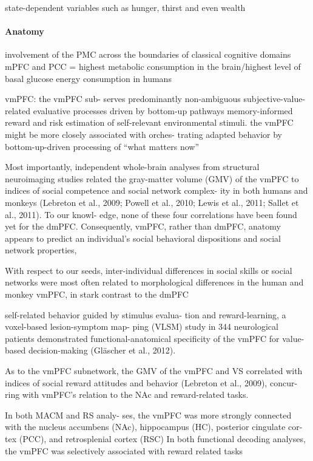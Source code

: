 \documentclass{article} %
\begin{document}


state-dependent variables such as hunger, thirst and
even wealth




\paragraph{Anatomy}
 involvement of the PMC across the boundaries of classical cognitive domains
mPFC and PCC = highest metabolic consumption in the brain/highest level of basal glucose energy consumption in humans


vmPFC:
the vmPFC sub- serves predominantly non-ambiguous subjective-value-related evaluative processes driven by bottom-up pathways
memory-informed reward and risk estimation of self-relevant environmental stimuli.
the vmPFC might be more closely associated with orches- trating adapted behavior by bottom-up-driven processing of “what matters now”

Most importantly, independent whole-brain analyses from structural neuroimaging studies related the gray-matter volume (GMV) of the vmPFC to indices of social competence and social network complex- ity in both humans and monkeys (Lebreton et al., 2009; Powell et al., 2010; Lewis et al., 2011; Sallet et al., 2011). To our knowl- edge, none of these four correlations have been found yet for the dmPFC. Consequently, vmPFC, rather than dmPFC, anatomy appears to predict an individual’s social behavioral dispositions and social network properties,

With respect to our seeds, inter-individual differences in social skills or social networks were most often related to morphological differences in the human and monkey vmPFC, in stark contrast to the dmPFC

self-related behavior guided by stimulus evalua- tion and reward-learning, a voxel-based lesion-symptom map- ping (VLSM) study in 344 neurological patients demonstrated functional-anatomical specificity of the vmPFC for value-based decision-making (Gläscher et al., 2012). 



As to the vmPFC subnetwork, the GMV of the vmPFC and VS correlated with indices of social reward attitudes and behavior (Lebreton et al., 2009), concur- ring with vmPFC’s relation to the NAc and reward-related tasks.


In both MACM and RS analy- ses, the vmPFC was more strongly connected with the nucleus accumbens (NAc), hippocampus (HC), posterior cingulate cor- tex (PCC), and retrosplenial cortex (RSC)
In both functional decoding analyses, the vmPFC was selectively associated with reward related tasks
\end{document}
